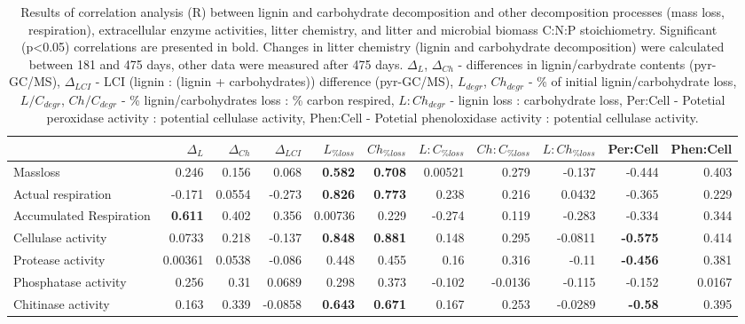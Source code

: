 \documentclass[10pt]{article}
\begin{document}
\begin{flushleft}
\begin{landscape}
\begin{table}[h!]
{\begin{tabular}{lrrrrrrrrrr}
   \hline
\end{tabular}
}
\end{table}
\newpage
\begin{table}[h!]
\centering
\caption{Results of correlation analysis (R) between lignin and carbohydrate decomposition and other decomposition processes (mass loss, respiration), extracellular enzyme activities, litter chemistry, and litter and microbial biomass C:N:P stoichiometry. Significant (p\textless 0.05) correlations are presented in bold. Changes in litter chemistry (lignin and carbohydrate decomposition) were calculated between 181 and 475 days, other data were measured after 475 days. $\Delta _{L}$, $\Delta _{Ch}$ - differences in lignin/carbydrate contents (pyr-GC/MS), $\Delta _{LCI}$ - LCI (lignin : (lignin + carbohydrates)) difference (pyr-GC/MS), $L_{degr}$, $Ch_{degr}$ - \% of initial lignin/carbohydrate loss, $L/C_{degr}$, $Ch/C_{degr}$  - \% lignin/carbohydrates loss : \% carbon respired, $L:Ch_{degr}$ - lignin loss : carbohydrate loss, Per:Cell - Potetial peroxidase activity : potential cellulase activity, Phen:Cell - Potetial phenoloxidase activity : potential cellulase activity.} 
\label{corrtable2}
{\small
\begin{tabular}{lrrrrrrrrrr}
  \hline
 & $\Delta _{L}$ & $\Delta _{Ch}$ & $\Delta _{LCI}$ & $L_{\%loss}$ & $Ch_{\%loss}$ & $L:C_{\%loss}$ & $Ch:C_{\%loss}$ & $L:Ch_{\%loss}$ & Per:Cell & Phen:Cell \\ 
  \hline
Massloss & 0.246 & 0.156 & 0.068 & \textbf{ 0.582 } & \textbf{ 0.708 } & 0.00521 & 0.279 & -0.137 & -0.444 & 0.403 \\ 
  Actual respiration & -0.171 & 0.0554 & -0.273 & \textbf{ 0.826 } & \textbf{ 0.773 } & 0.238 & 0.216 & 0.0432 & -0.365 & 0.229 \\ 
  Accumulated Respiration & \textbf{ 0.611 } & 0.402 & 0.356 & 0.00736 & 0.229 & -0.274 & 0.119 & -0.283 & -0.334 & 0.344 \\ 
  Cellulase activity & 0.0733 & 0.218 & -0.137 & \textbf{ 0.848 } & \textbf{ 0.881 } & 0.148 & 0.295 & -0.0811 & \textbf{ -0.575 } & 0.414 \\ 
  Protease activity & 0.00361 & 0.0538 & -0.086 & 0.448 & 0.455 & 0.16 & 0.316 & -0.11 & \textbf{ -0.456 } & 0.381 \\ 
  Phosphatase activity & 0.256 & 0.31 & 0.0689 & 0.298 & 0.373 & -0.102 & -0.0136 & -0.115 & -0.152 & 0.0167 \\ 
  Chitinase activity & 0.163 & 0.339 & -0.0858 & \textbf{ 0.643 } & \textbf{ 0.671 } & 0.167 & 0.253 & -0.0289 & \textbf{ -0.58 } & 0.395 \\ 

\end{tabular}}
\end{table}
\end{landscape}
\end{flushleft}
\end{document}
